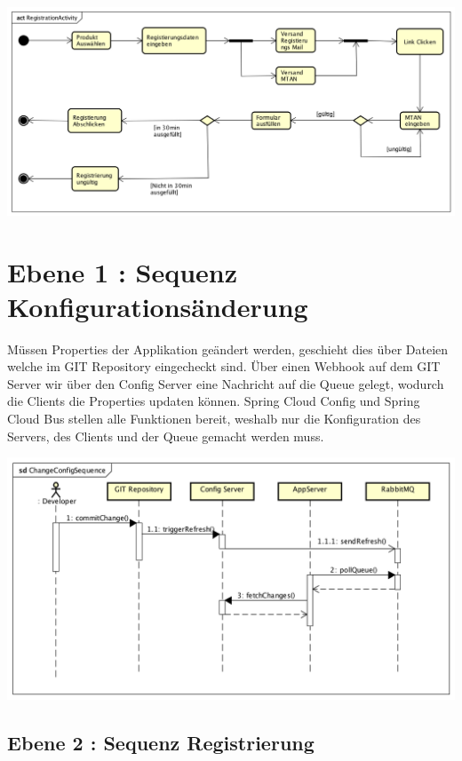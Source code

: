\begin{center}
	\includegraphics[scale=0.44]{RegistrationActivity.png}
\end{center}

\section{Ebene 1 : Sequenz Konfigurationsänderung}

Müssen Properties der Applikation geändert werden, geschieht dies über Dateien  welche im GIT Repository eingecheckt sind. Über einen Webhook auf dem GIT Server wir über den Config Server eine Nachricht auf die Queue gelegt, wodurch die Clients die Properties updaten können. Spring Cloud Config und Spring Cloud Bus stellen alle Funktionen bereit, weshalb nur die Konfiguration des Servers, des Clients und der Queue gemacht werden muss.
\begin{center}
	\includegraphics[scale=0.6]{ChangeConfigSequence.png}
\end{center}
\newpage

\subsection{Ebene 2 : Sequenz Registrierung}

